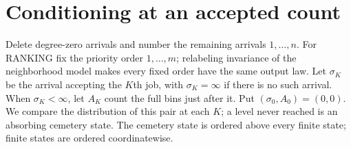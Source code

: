 \documentclass[11pt]{article}
\begin{document}
\section{Conditioning at an accepted count}\label{sec:history}
Delete degree-zero arrivals and number the remaining arrivals
$1,\ldots,n$. For RANKING fix the priority order $1,\ldots,m$;
relabeling invariance of the neighborhood model makes every fixed
order have the same output law. Let $\sigma_K$ be the arrival accepting
the $K$th job, with $\sigma_K=\infty$ if there is no such arrival.
When $\sigma_K<\infty$, let $A_K$ count the full bins just after it.
Put $(\sigma_0,A_0)=(0,0)$. We compare the distribution of this pair
at each $K$; a level never reached is an absorbing cemetery state.
The cemetery state is ordered above every finite state; finite states
are ordered coordinatewise.
\end{document}
